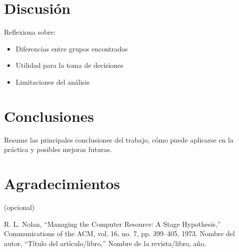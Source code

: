\documentclass[conference]{IEEEtran}
\begin{document}
\section{Discusión}
Reflexiona sobre:
\begin{itemize}
    \item Diferencias entre grupos encontrados
    \item Utilidad para la toma de decisiones
    \item Limitaciones del análisis
\end{itemize}

\section{Conclusiones}
Resume las principales conclusiones del trabajo, cómo puede aplicarse en la práctica y posibles mejoras futuras.

\section*{Agradecimientos}
(opcional)

\begin{thebibliography}{99}
 R. L. Nolan, “Managing the Computer Resource: A Stage Hypothesis,” Communications of the ACM, vol. 16, no. 7, pp. 399–405, 1973.
 Nombre del autor, “Título del artículo/libro,” Nombre de la revista/libro, año.
\end{thebibliography}
\end{document}
